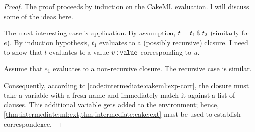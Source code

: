 \begin{proof}
  The proof proceeds by induction on the CakeML evaluation.
  I will discuss some of the ideas here.

  The most interesting case is application.
  By assumption, $t = t_1\mathbin{\$}t_2$ (similarly for $e$).
  By induction hypothesis, $t_1$ evaluates to a (possibly recursive) closure.
  I need to show that $t$ evaluates to a value $v \mathbin{:\!\!:} \texttt{\textup{value}}$ corresponding to $u$.

  Assume that $e_1$ evaluates to a non-recursive closure.
  The recursive case is similar.

  Consequently, according to \cref{code:intermediate:cakeml:exp-corr}, the closure must take a variable with a fresh name and immediately match it against a list of clauses.
  This additional variable gets added to the environment; hence, \cref{thm:intermediate:ml:ext,thm:intermediate:cake:ext} must be used to establish correspondence.
\end{proof}
